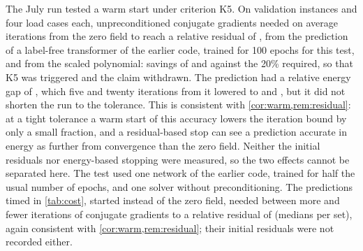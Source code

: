 The July run tested a warm start under criterion K5. On \numKfiveEval{} validation instances
and four load cases each, unpreconditioned conjugate gradients needed on average
\numKfiveZero{} iterations from the zero field to reach a relative residual of
\numKfiveTol{}, \numKfiveFree{} from the prediction of a label-free transformer of the
earlier code, trained for 100 epochs for this test, and \numKfiveNaive{} from the scaled
polynomial: savings of \numKfiveSaving{} and \numKfiveNaiveSaving{} against the 20\%
required, so that K5 was triggered and the claim withdrawn. The prediction had a relative
energy gap of \numKfiveStartGap{}, which five and twenty iterations from it lowered to
\numKfiveFiveGap{} and \numKfiveTwentyGap{}, but it did not shorten the run to the
tolerance. This is consistent with \cref{cor:warm,rem:residual}: at a tight tolerance a warm
start of this accuracy lowers the iteration bound by only a small fraction, and a
residual-based stop can see a prediction accurate in energy as further from convergence than
the zero field. Neither the initial residuals nor energy-based stopping were measured, so
the two effects cannot be separated here. The test used one network of the earlier code,
trained for half the usual number of epochs, and one solver without preconditioning. The
predictions timed in \cref{tab:cost}, started instead of the zero field, needed between
\numCostWarmMore{} more and \numCostWarmFewer{} fewer iterations of conjugate gradients to a
relative residual of \numCostCgTol{} (medians per set), again consistent with
\cref{cor:warm,rem:residual}; their initial residuals were not recorded either.

